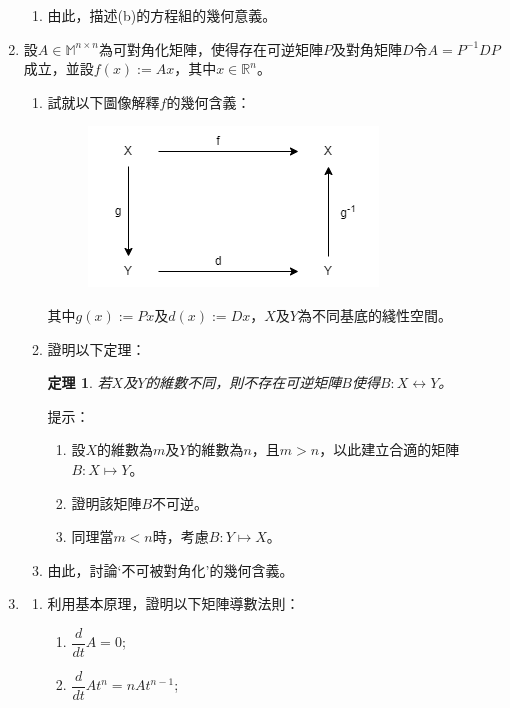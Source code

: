 \documentclass[12pt]{article}
\newtheorem*{theorem}{定理}
\begin{document}
\begin{enumerate}
\begin{enumerate}
            \item 由此，描述(b)的方程組的幾何意義。
        \end{enumerate}
        \item 設$A\in\mathbb{M}^{n\times n}$為可對角化矩陣，使得存在可逆矩陣$P$及對角矩陣$D$令$A=P^{-1}DP$成立，並設$f(x):=Ax$，其中$x\in\mathbb{R}^n$。\begin{enumerate}
            \item 試就以下圖像解釋$f$的幾何含義：
            \begin{figure}[H]
                \centering
                \includegraphics[scale=0.6]{commutative_diagram_diagonalization.png}
            \end{figure}
            其中$g(x):=Px$及$d(x):=Dx$，$X$及$Y$為不同基底的綫性空間。
            \item 證明以下定理：\begin{theorem}
                若$X$及$Y$的維數不同，則不存在可逆矩陣$B$使得$B:X\leftrightarrow Y$。
            \end{theorem}
            提示：\begin{enumerate}
                \item 設$X$的維數為$m$及$Y$的維數為$n$，且$m>n$，以此建立合適的矩陣$B:X\mapsto Y$。
                \item 證明該矩陣$B$不可逆。
                \item 同理當$m<n$時，考慮$B:Y\mapsto X$。
            \end{enumerate}
            \item 由此，討論‘不可被對角化’的幾何含義。
        \end{enumerate}
        \item \begin{enumerate}
            \item 利用基本原理，證明以下矩陣導數法則：\begin{enumerate}
                \item $\dfrac{d}{dt}A=0$;
                \item $\dfrac{d}{dt}At^n=nAt^{n-1}$;

\end{enumerate}
\end{enumerate}
\end{enumerate}
\end{document}
